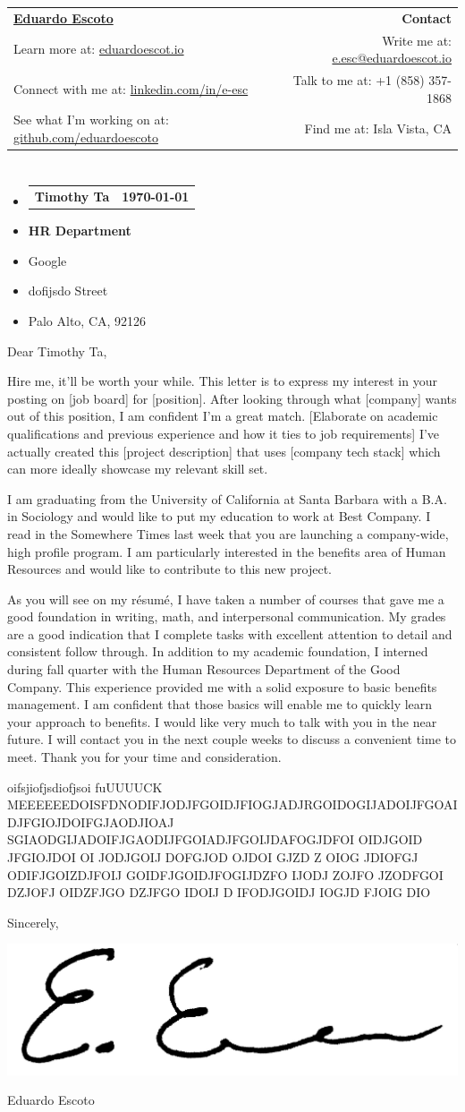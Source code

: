 \documentclass[letterpaper,11pt]{article}
\makeatletter
\newcommand{\CompanyName}{Google}
\newcommand{\Department}{HR Department}
\newcommand{\EmployerName}{Timothy Ta}
\newcommand{\CompanyAddress}{dofijsdo Street}
\newcommand{\CompanyCSZP}{Palo Alto, CA, 92126}
\newcommand{\Date}[1][\today]{#1}
\newcommand{\Name}{Eduardo Escoto}
\newcommand{\PersonalWebsite}{eduardoescot.io}
\newcommand{\LinkedIn}{linkedin.com/in/e-esc}
\newcommand{\Github}{github.com/eduardoescoto}
\newcommand{\PersonalEmail}{e.esc@eduardoescot.io}
\newcommand{\PhoneNumber}{+1 (858) 357-1868}
\newcommand{\Location}{Isla Vista, CA}
\newcommand{\Signature}{\includegraphics[height=2.2\baselineskip]{../assets/signature}}
\newcommand{\Header}{
  \begin{tabular*}{\textwidth}{l@{\extracolsep{\fill}}r}
  \textbf{\href{\PersonalWebsite}{\Huge{\Name}}} & \textbf{\LARGE Contact}\\
  Learn more at: \href{http://PersonalWebsite}{\PersonalWebsite} & Write me at: \href{mailto:\PersonalEmail}{\PersonalEmail}\\
  Connect with me at: \href{https://\LinkedIn}{\LinkedIn} & Talk to me at: \PhoneNumber \\
  See what I'm working on at: \href{https://\Github}{\Github} & Find me at: \Location
  \end{tabular*}\vspace{-5pt}
  \section{}
}
\newcommand{\EmployerInformation}{
  \begin{itemize}[leftmargin=0pt]
    \item[]{
      \begin{tabular*}{\textwidth}[t]{l@{\extracolsep{\fill}}r}
      \large{{\textbf{\EmployerName}}} & \large{{\textbf{\Date}}}
    \end{tabular*}\vspace{-6pt}
    }
    \item[]{\large{\textbf{\Department}}}\vspace{-6pt}
    \item[]{\large{\CompanyName}}\vspace{-6pt}
    \item[]{\large{\CompanyAddress}}\vspace{-6pt}
    \item[]{\large{\CompanyCSZP}}\vspace{-6pt} 
  \end{itemize}
}
\newcommand{\Salutation}{
  \vspace{30pt}
  Dear \EmployerName{}, \par \bigskip
}
\newcommand{\CoverLetterParagraph}[1]{
  \par
  #1
  \bigskip
  }
\newcommand{\Closing}{
  \vspace{30pt}
  \par Sincerely, \bigskip
  \par \Signature \medskip
  \par \Name
  }
\makeatother
\begin{document}
\Header
\EmployerInformation

\Salutation

\CoverLetterParagraph{  
  Hire me, it'll be worth your while. This letter is to express my interest in your posting on [job board] for [position].
  After looking through what [company] wants out of this position, I am confident I'm a great match.
  [Elaborate on academic qualifications and previous experience and how it ties to job requirements]
  I've actually created this [project description] that uses [company tech stack] which can more ideally showcase my relevant skill set.
}
 
\CoverLetterParagraph{
  I am graduating from the University of California at Santa Barbara with a B.A. in Sociology
  and would like to put my education to work at Best Company. I read in the Somewhere Times
  last week that you are launching a company-wide, high profile program. I am particularly
  interested in the benefits area of Human Resources and would like to contribute to this new
  project.
}

\CoverLetterParagraph{
  As you will see on my résumé, I have taken a number of courses that gave me a good foundation in writing, math, and interpersonal communication. My grades are a good indication
  that I complete tasks with excellent attention to detail and consistent follow through. In addition to my academic foundation, I interned during fall quarter with the Human Resources
  Department of the Good Company. This experience provided me with a solid exposure to
  basic benefits management. I am confident that those basics will enable me to quickly learn
  your approach to benefits.
  I would like very much to talk with you in the near future. I will contact you in the next couple weeks to discuss a convenient time to meet. Thank you for your time and consideration.
}

\CoverLetterParagraph{
  oifsjiofjsdiofjsoi fuUUUUCK MEEEEEEDOISFDNODIFJODJFGOIDJFIOGJADJRGOIDOGIJADOIJFGOAIDJFGIOJDOIFGJAODJIOAJ
  SGIAODGIJADOIFJGAODIJFGOIADJFGOIJDAFOGJDFOI OIDJGOID JFGIOJDOI OI JODJGOIJ DOFGJOD OJDOI GJZD
  Z OIOG JDIOFGJ ODIFJGOIZDJFOIJ GOIDFJGOIDJFOGIJDZFO IJODJ ZOJFO JZODFGOI DZJOFJ OIDZFJGO DZJFGO IDOIJ D
   IFODJGOIDJ IOGJD FJOIG DIO
}

\Closing
\end{document}
